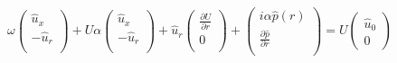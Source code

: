 \documentclass[superscriptaddress, onecolumn, prl]{revtex4}
\begin{document}
\begin{equation}
\omega
\begin{pmatrix} 
\hat{u}_x \\
- \hat{u}_r \\
\end{pmatrix}
+ U \alpha  \begin{pmatrix}
\hat{u}_x \\
- \hat{u}_r \\
\end{pmatrix}
+\hat{u}_r \begin{pmatrix}
\frac{\partial U}{\partial r}\\
0\\
\end{pmatrix}
+\begin{pmatrix}
i \alpha \hat{p}(r) \\
\frac{\partial \hat{p}}{\partial r} \\ 
\end{pmatrix}
= U \begin{pmatrix}
 \hat{u}_0 \\
 0 
\end{pmatrix}
\end{equation}
\end{document}
